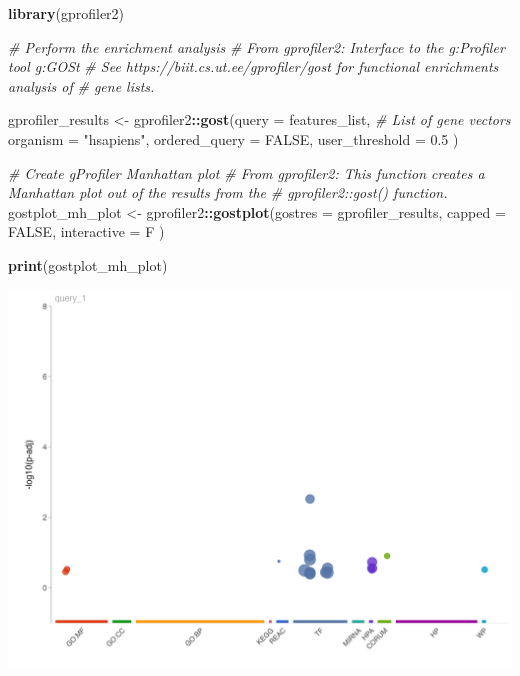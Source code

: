 \documentclass[
]{article}
\newenvironment{Shaded}{\begin{snugshade}}{\end{snugshade}}
\newcommand{\AttributeTok}[1]{\textcolor[rgb]{0.13,0.29,0.53}{#1}}
\newcommand{\CommentTok}[1]{\textcolor[rgb]{0.56,0.35,0.01}{\textit{#1}}}
\newcommand{\ConstantTok}[1]{\textcolor[rgb]{0.56,0.35,0.01}{#1}}
\newcommand{\FloatTok}[1]{\textcolor[rgb]{0.00,0.00,0.81}{#1}}
\newcommand{\FunctionTok}[1]{\textcolor[rgb]{0.13,0.29,0.53}{\textbf{#1}}}
\newcommand{\NormalTok}[1]{#1}
\newcommand{\OtherTok}[1]{\textcolor[rgb]{0.56,0.35,0.01}{#1}}
\newcommand{\SpecialCharTok}[1]{\textcolor[rgb]{0.81,0.36,0.00}{\textbf{#1}}}
\newcommand{\StringTok}[1]{\textcolor[rgb]{0.31,0.60,0.02}{#1}}
\begin{document}
\begin{Shaded}
\begin{Highlighting}[]
\FunctionTok{library}\NormalTok{(gprofiler2)}

\CommentTok{\# Perform the enrichment analysis}
\CommentTok{\# From gprofiler2: Interface to the g:Profiler tool g:GOSt }
\CommentTok{\# See https://biit.cs.ut.ee/gprofiler/gost for functional enrichments analysis of }
\CommentTok{\# gene lists.}

\NormalTok{gprofiler\_results }\OtherTok{\textless{}{-}}\NormalTok{ gprofiler2}\SpecialCharTok{::}\FunctionTok{gost}\NormalTok{(}\AttributeTok{query =}\NormalTok{ features\_list, }\CommentTok{\# List of gene vectors}
                                      \AttributeTok{organism =} \StringTok{"hsapiens"}\NormalTok{, }
                                      \AttributeTok{ordered\_query =} \ConstantTok{FALSE}\NormalTok{, }
                                      \AttributeTok{user\_threshold =} \FloatTok{0.5}
\NormalTok{                                      )}

\CommentTok{\# Create gProfiler Manhattan plot}
\CommentTok{\# From gprofiler2: This function creates a Manhattan plot out of the results from the }
\CommentTok{\# gprofiler2::gost() function. }
\NormalTok{gostplot\_mh\_plot }\OtherTok{\textless{}{-}}\NormalTok{ gprofiler2}\SpecialCharTok{::}\FunctionTok{gostplot}\NormalTok{(}\AttributeTok{gostres =}\NormalTok{ gprofiler\_results, }
                                         \AttributeTok{capped =} \ConstantTok{FALSE}\NormalTok{, }
                                         \AttributeTok{interactive =}\NormalTok{ F}
\NormalTok{                                         )}

\FunctionTok{print}\NormalTok{(gostplot\_mh\_plot)}
\end{Highlighting}
\end{Shaded}

\begin{center}\includegraphics[width=1\linewidth]{images/demo_gostplot_mhplot} \end{center}
\end{document}
